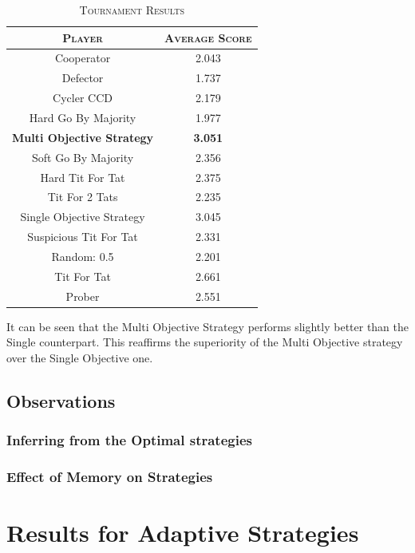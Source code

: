 \documentclass[a4paper]{article}
\begin{document}
	\begin{table}[H]
	  \begin{center}
	    \begin{tabular}{c|c}
	      \toprule
	      \textsc{Player} & \textsc{Average Score}\\
	      \midrule
			Cooperator & 2.043\\
			Defector & 1.737\\
			Cycler CCD & 2.179\\
			Hard Go By Majority & 1.977\\
			\textbf{Multi Objective Strategy} & \textbf{3.051}\\
			Soft Go By Majority & 2.356\\
			Hard Tit For Tat & 2.375\\
			Tit For 2 Tats & 2.235\\
			{Single Objective Strategy} & {3.045}\\
			Suspicious Tit For Tat & 2.331\\
			Random: 0.5 & 2.201\\
			Tit For Tat & 2.661\\
			Prober & 2.551\\
		  \bottomrule
	    \end{tabular}
	    \caption{\textsc{Tournament Results}}
	  \end{center}
	\end{table}  

	It can be seen that the Multi Objective Strategy performs slightly better than the Single counterpart. This reaffirms the superiority of the Multi Objective strategy over the Single Objective one.
	
	\subsection{Observations}
	
	\subsubsection{Inferring from the Optimal strategies}
	
	\subsubsection{Effect of Memory on Strategies}	

	\section{Results for Adaptive Strategies}
\end{document}
